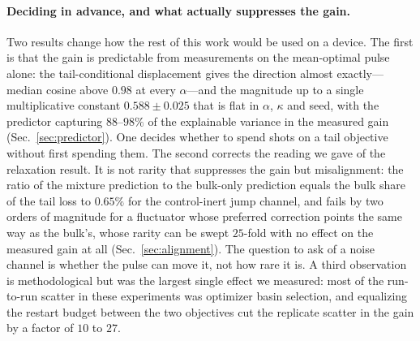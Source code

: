 \documentclass[aps,pra,twocolumn,superscriptaddress,reprint,nofootinbib,floatfix]{revtex4-2}
\theoremstyle{definition}
\begin{document}
\paragraph*{Deciding in advance, and what actually suppresses the gain.} Two
results change how the rest of this work would be used on a device. The
first is that the gain is predictable from measurements on the mean-optimal
pulse alone: the tail-conditional displacement gives the direction almost
exactly---median cosine above $0.98$ at every $\alpha$---and the magnitude up
to a single multiplicative constant $0.588\pm0.025$ that is flat in $\alpha$,
$\kappa$ and seed, with the predictor capturing $88$--$98\%$ of the
explainable variance in the measured gain (Sec.~\ref{sec:predictor}). One
decides whether to spend shots on a tail objective without first spending
them. The second corrects the reading we gave of the relaxation result. It is
not rarity that suppresses the gain but misalignment: the ratio of the
mixture prediction to the bulk-only prediction equals the bulk share of the
tail loss to $0.65\%$ for the control-inert jump channel, and fails by two
orders of magnitude for a fluctuator whose preferred correction points the
same way as the bulk's, whose rarity can be swept $25$-fold with no effect on
the measured gain at all (Sec.~\ref{sec:alignment}). The question to ask of a
noise channel is whether the pulse can move it, not how rare it is. A third
observation is methodological but was the largest single effect we measured:
most of the run-to-run scatter in these experiments was optimizer basin
selection, and equalizing the restart budget between the two objectives cut
the replicate scatter in the gain by a factor of $10$ to $27$.
\end{document}

